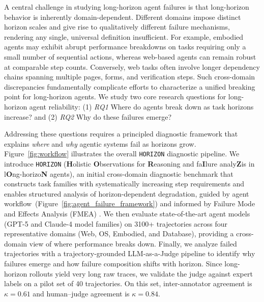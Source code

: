 \documentclass[11pt]{article}
\begin{document}
A central challenge in studying long-horizon agent failures is that long-horizon behavior is inherently domain-dependent. Different domains impose distinct horizon scales and give rise to qualitatively different failure mechanisms, rendering any single, universal definition insufficient. For example, embodied agents may exhibit abrupt performance breakdowns on tasks requiring only a small number of sequential actions, whereas web-based agents can remain robust at comparable step counts. Conversely, web tasks often involve longer dependency chains spanning multiple pages, forms, and verification steps. Such cross-domain discrepancies fundamentally complicate efforts to characterize a unified breaking point for long-horizon agents. We study two core research questions for long-horizon agent reliability: (1) \textit{RQ1} Where do agents break down as task horizons increase? and (2) \textit{RQ2} Why do these failures emerge?

Addressing these questions requires a principled diagnostic framework that explains \emph{where} and \emph{why} agentic systems fail as horizons grow. Figure~\ref{fig:workflow} illustrates the overall \texttt{HORIZON} diagnostic pipeline.
We introduce \texttt{HORIZON} (\textbf{H}olistic \textbf{O}bservations 
for \textbf{R}easoning and fa\textbf{I}lure analy\textbf{Z}is in 
l\textbf{O}ng-horizo\textbf{N} agents), an initial cross-domain diagnostic benchmark that constructs task families with systematically increasing step requirements and enables structured analysis of horizon-dependent degradation, guided by agent workflow~(Figure~\ref{fig:agent_failure_framework}) and informed by Failure Mode and Effects Analysis (FMEA) \citep{aiag2019fmea}.
We then evaluate state-of-the-art agent models (GPT-5 and Claude-4 model families) on 3100+ trajectories across four representative domains (Web, OS, Embodied, and Database), providing a cross-domain view of where performance breaks down.
Finally, we analyze failed trajectories with a trajectory-grounded LLM-as-a-Judge pipeline to identify why failures emerge and how failure composition shifts with horizon.
Since long-horizon rollouts yield very long raw traces, we validate the judge against expert labels on a pilot set of 40 trajectories.
On this set, inter-annotator agreement is \(\kappa{=}0.61\) and human--judge agreement is \(\kappa{=}0.84\). 
\end{document}
